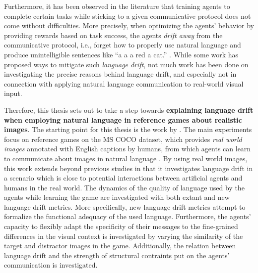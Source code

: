 Furthermore, it has been observed in the literature that training agents to complete certain tasks while sticking to a given communicative protocol does not come without difficulties. More precisely, when optimizing the agents' behavior by providing rewards based on task success, the agents \textit{drift away} from the communicative protocol, i.e., forget how to properly use natural language and produce unintelligible sentences like ``a a a red a cat.'' \parencite{lee2019countering, lazaridou2020multi, lu2020countering, lewis2017deal}. While some work has proposed ways to mitigate such \textit{language drift}, not much work has been done on investigating the precise reasons behind language drift, and especially not in connection with applying natural language communication to real-world visual input. 

Therefore, this thesis sets out to take a step towards \textbf{explaining language drift when employing natural language in reference games about realistic images}. The starting point for this thesis is the work by \cite{lazaridou2020multi}. The main  experiments focus on reference games on the MS COCO dataset, which provides \textit{real world images} annotated with English captions by humans, from which agents can learn to communicate about images in natural language \parencite{chen2015microsoft}. By using real world images, this work extends beyond previous studies in that it investigates language drift in a scenario which is close to potential interactions between artificial agents and humans in the real world. The dynamics of the quality of language used by the agents while learning the game are investigated with both extant and new language drift metrics. More specifically, new language drift metrics attempt to formalize the functional adequacy of the used language. Furthermore, the agents' capacity to flexibly adapt the specificity of their messages to the fine-grained differences in the visual context is investigated by varying the similarity of the target and distractor images in the game. Additionally, the relation between language drift and the strength of structural contraints put on the agents' communication is investigated.

